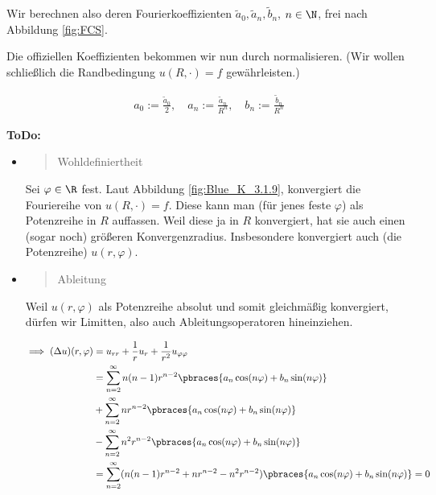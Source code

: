 \begin{solution}
\begin{enumerate}[label = (\roman*)]

    Wir berechnen also deren Fourierkoeffizienten $\tilde{a}_0, \tilde{a}_n, \tilde{b}_n$, $n \in \N$, frei nach Abbildung \ref{fig:FCS}.


    Die offiziellen Koeffizienten bekommen wir nun durch normalisieren.
    (Wir wollen schließlich die Randbedingung $u(R, \cdot) = f$ gewährleisten.)

    \begin{align*}
        a_0 := \frac{\tilde{a}_0}{2}, \quad a_n := \frac{\tilde{a}_n}{R^n},
        \quad
        b_n := \frac{\tilde{b}_n}{R^n}
    \end{align*}

    \textbf{ToDo:}
    \begin{itemize}

        \item \blockquote{Wohldefiniertheit}:
        Sei $\varphi \in \R$ fest.
        Laut Abbildung \ref{fig:Blue_K_3.1.9}, konvergiert die Fouriereihe von $u(R, \cdot) = f$.
        Diese kann man (für jenes feste $\varphi$) als Potenzreihe in $R$ auffassen.
        Weil diese ja in $R$ konvergiert, hat sie auch einen (sogar noch) größeren Konvergenzradius.
        Insbesondere konvergiert auch (die Potenzreihe) $u(r, \varphi)$.

        \item \blockquote{Ableitung}:
        Weil $u(r, \varphi)$ als Potenzreihe absolut und somit gleichmäßig konvergiert, dürfen wir Limitten, also auch Ableitungsoperatoren hineinziehen.

        \begin{align*}
            \implies
            (\Delta u)(r, \varphi)
            & =
            u_{rr} + \frac{1}{r} u_r + \frac{1}{r^2} u_{\varphi \varphi} \\
            & =
            \sum_{n=2}^\infty
            n (n-1) r^{n-2}
            \pbraces
            {
                a_n \cos(n \varphi)
                +
                b_n \sin(n \varphi)
            } \\
            & +
            \sum_{n=2}^\infty
            n r^{n-2}
            \pbraces
            {
                a_n \cos(n \varphi)
                +
                b_n \sin(n \varphi)
            } \\
            & -
            \sum_{n=2}^\infty
            n^2 r^{n-2}
            \pbraces
            {
                a_n \cos(n \varphi)
                +
                b_n \sin(n \varphi)
            } \\
            & =
            \sum_{n=2}^\infty
            (
                n (n-1) r^{n-2}
                +
                n r^{n-2}
                -
                n^2 r^{n-2}
            )
            \pbraces
            {
                a_n \cos(n \varphi)
                +
                b_n \sin(n \varphi)
            }
            = 0
        \end{align*}


\end{itemize}
\end{enumerate}
\end{solution}
